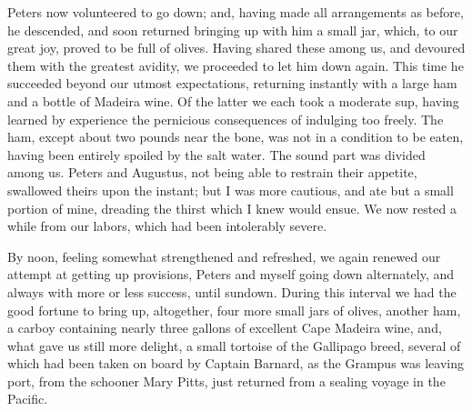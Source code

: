 Peters now volunteered to go down; and, having made all arrangements as
before, he descended, and soon returned bringing up with him a small jar, which,
to our great joy, proved to be full of olives. Having shared these among us, and
devoured them with the greatest avidity, we proceeded to let him down again.
This time he succeeded beyond our utmost expectations, returning instantly with
a large ham and a bottle of Madeira wine. Of the latter we each took a moderate
sup, having learned by experience the pernicious consequences of indulging too
freely. The ham, except about two pounds near the bone, was not in a condition
to be eaten, having been entirely spoiled by the salt water. The sound part was
divided among us. Peters and Augustus, not being able to restrain their
appetite, swallowed theirs upon the instant; but I was more cautious, and ate
but a small portion of mine, dreading the thirst which I knew would ensue. We
now rested a while from our labors, which had been intolerably severe. 

By noon, feeling somewhat strengthened and refreshed, we again renewed our
attempt at getting up provisions, Peters and myself going down alternately, and
always with more or less success, until sundown. During this interval we had the
good fortune to bring up, altogether, four more small jars of olives, another
ham, a carboy containing nearly three gallons of excellent Cape Madeira wine,
and, what gave us still more delight, a small tortoise of the Gallipago breed,
several of which had been taken on board by Captain Barnard, as the Grampus was
leaving port, from the schooner Mary Pitts, just returned from a sealing voyage
in the Pacific. 

